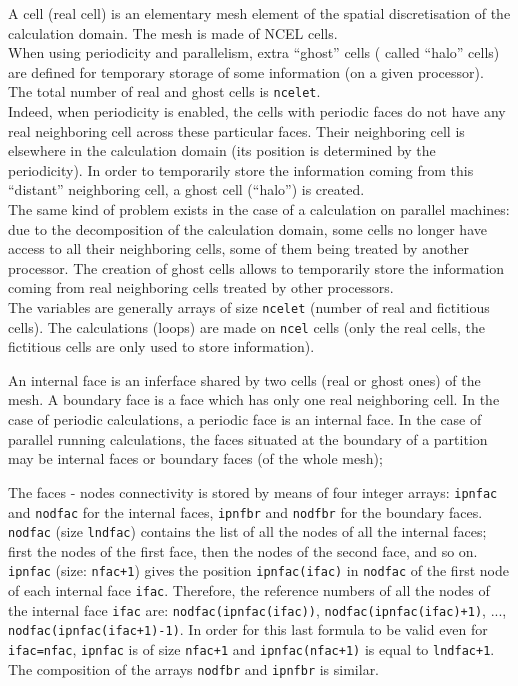 {{{
A cell (real cell) is an elementary mesh element of the spatial
discretisation of the calculation domain. The mesh is made of NCEL cells.\\
When using periodicity and parallelism, extra ``ghost'' cells
( called ``halo'' cells) are defined for temporary storage of some information
(on a given processor).
The total number of real and ghost cells is \texttt{ncelet}. \\
\hspace*{1cm} Indeed, when periodicity is enabled, the cells with
periodic faces do not have any real neighboring cell across these
particular faces. Their neighboring cell is elsewhere in the calculation
domain (its position is determined by the periodicity). In order to
temporarily store the information coming from this ``distant''
neighboring cell, a ghost cell (``halo'') is created. \\
\hspace*{1cm} The same kind of problem exists in the case of a
calculation on parallel machines: due to the decomposition of the
calculation domain, some cells no longer have access to all
their neighboring cells, some of them being treated by another processor. The
creation of ghost cells allows to temporarily store the information
coming from real neighboring cells treated by other processors.\\
The variables are generally arrays of size \texttt{ncelet} (number of real and
fictitious cells). The calculations (loops) are made on \texttt{ncel} cells (only
the real cells, the fictitious cells are only used to store information).

An internal face is an inferface shared by two cells (real or ghost
ones) of the mesh. A boundary face is a face which has only one real
neighboring cell. In the case of periodic calculations, a periodic face
is an internal face. In the case of parallel running calculations, the
faces situated at the boundary of a partition may be internal faces or
boundary faces (of the whole mesh);

\label{prg_nodfac}
The faces - nodes connectivity is stored by
means of four integer arrays: \texttt{ipnfac} and \texttt{nodfac} for the
internal faces, \texttt{ipnfbr} and \texttt{nodfbr} for the boundary faces.
\texttt{nodfac} (size \texttt{lndfac})
contains the list of all the nodes of all the internal faces; first the nodes of
the first face, then the nodes of the second face, and so on.
\texttt{ipnfac} (size: \texttt{nfac+1}) gives the position \texttt{ipnfac(ifac)}
in \texttt{nodfac} of the first node of each internal face \texttt{ifac}.
Therefore, the reference numbers of all
the nodes of the internal face \texttt{ifac} are: \texttt{nodfac(ipnfac(ifac))},
\texttt{nodfac(ipnfac(ifac)+1)}, ..., \texttt{nodfac(ipnfac(ifac+1)-1)}.
In order for this last formula to be valid even for \texttt{ifac=nfac},
\texttt{ipnfac} is of size \texttt{nfac+1} and \texttt{ipnfac(nfac+1)}
is equal to \texttt{lndfac+1}.\\
The composition of the arrays \texttt{nodfbr} and \texttt{ipnfbr} is similar.

}}}
